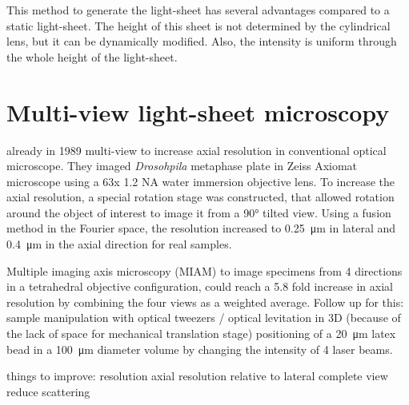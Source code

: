       This method to generate the light-sheet has several advantages compared to a static light-sheet. The height of this sheet is not determined by the cylindrical lens, but it can be dynamically modified. Also, the intensity is uniform through the whole height of the light-sheet.




\section{Multi-view light-sheet microscopy}
  already in 1989 multi-view to increase axial resolution in conventional optical microscope. They imaged \textit{Drosohpila} metaphase plate in Zeiss Axiomat microscope using a 63x 1.2 NA water immersion objective lens. To increase the axial resolution, a special rotation stage was constructed, that allowed rotation around the object of interest to image it from a 90\si{\degree} tilted view. Using a fusion method in the Fourier space, the resolution increased to \SI{0.25}{\micro\meter} in lateral and \SI{0.4}{\micro\meter} in the axial direction for real samples.

  Multiple imaging axis microscopy (MIAM) \cite{swoger_multiple_2003}
  to image specimens from 4 directions in a tetrahedral objective configuration, could reach a 5.8 fold increase in axial resolution by combining the four views as a weighted average.
  Follow up for this: sample manipulation with optical tweezers / optical levitation in 3D \cite{huisken_three-dimensional_2007}(because of the lack of space for mechanical translation stage)
  positioning of a \SI{20}{\micro m} latex bead in a \SI{100}{\micro m} diameter volume by changing the intensity of 4 laser beams. 

  things to improve: resolution
  axial resolution relative to lateral
  complete view
  reduce scattering